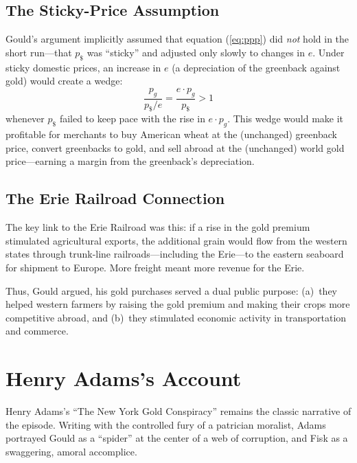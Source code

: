 \documentclass[12pt]{article}
\begin{document}
\subsection{The Sticky-Price Assumption}

Gould's argument implicitly assumed that equation (\ref{eq:ppp}) did 
\emph{not} hold in the short run---that $p_{\$}$ was ``sticky'' and 
adjusted only slowly to changes in $e$. Under sticky domestic prices, an 
increase in $e$ (a depreciation of the greenback against gold) would 
create a wedge:
\begin{equation}\label{eq:wedge}
    \frac{p_g}{p_{\$}/e} = \frac{e \cdot p_g}{p_{\$}} > 1
\end{equation}
whenever $p_{\$}$ failed to keep pace with the rise in $e \cdot p_g$. 
This wedge would make it profitable for merchants to buy American wheat 
at the (unchanged) greenback price, convert greenbacks to gold, and sell 
abroad at the (unchanged) world gold price---earning a margin from the 
greenback's depreciation.

\subsection{The Erie Railroad Connection}

The key link to the Erie Railroad was this: if a rise in the gold premium 
stimulated agricultural exports, the additional grain would flow from the 
western states through trunk-line railroads---including the Erie---to the 
eastern seaboard for shipment to Europe. More freight meant more revenue 
for the Erie.

Thus, Gould argued, his gold purchases served a dual public purpose: 
(a)~they helped western farmers by raising the gold premium and making 
their crops more competitive abroad, and (b)~they stimulated economic 
activity in transportation and commerce.

\section{Henry Adams's Account}

Henry Adams's ``The New York Gold Conspiracy'' remains the classic 
narrative of the episode. Writing with the controlled fury of a patrician 
moralist, Adams portrayed Gould as a ``spider'' at the center of a web 
of corruption, and Fisk as a swaggering, amoral accomplice.
\end{document}
